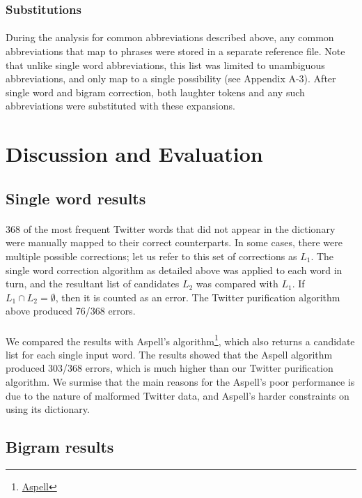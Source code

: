 \documentclass[twocolumn,10pt]{article}
\begin{document}
\subsubsection*{Substitutions}
\paragraph{} During the analysis for common abbreviations described above, any common abbreviations that map to phrases were stored in a separate reference file. Note that unlike single word abbreviations, this list was limited to unambiguous abbreviations, and only map to a single possibility (see Appendix A-3). After single word and bigram correction, both laughter tokens and any such abbreviations were substituted with these expansions.
\section*{Discussion and Evaluation}
\subsection*{Single word results}
\paragraph{} 368 of the most frequent Twitter words that did not appear in the dictionary were manually mapped to their correct counterparts. In some cases, there were multiple possible corrections; let us refer to this set of corrections as $L_1$. The single word correction algorithm as detailed above was applied to each word in turn, and the resultant list of candidates $L_2$ was compared with $L_1$. If $L_1\cap L_2 = \emptyset$, then it is counted as an error. The Twitter purification algorithm above produced 76/368 errors.
\paragraph{}We compared the results with Aspell's algorithm\footnote{\href{http://aspell.net/}{Aspell}}, which also returns a candidate list for each single input word. The results showed that the Aspell algorithm produced 303/368 errors, which is much higher than our Twitter purification algorithm. We surmise that the main reasons for the Aspell's poor performance is due to the nature of malformed Twitter data, and Aspell's harder constraints on using its dictionary.
\subsection*{Bigram results}
\end{document}
